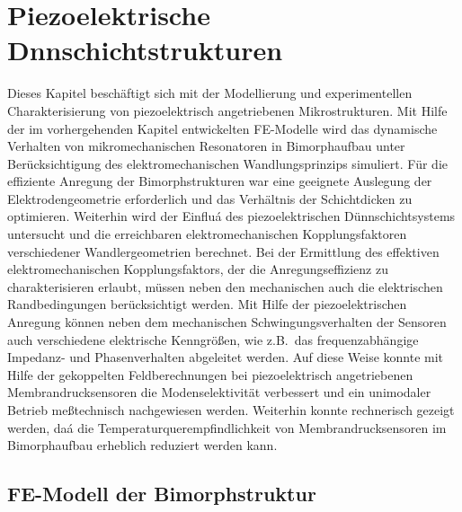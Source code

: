 \chapter{Piezoelektrische Dnnschichtstrukturen}
\label{piezoelektrisch}

Dieses Kapitel beschäftigt sich mit der Modellierung und experimentellen
Charakterisierung von piezoelektrisch angetriebenen Mikrostrukturen.
Mit Hilfe der im vorhergehenden Kapitel entwickelten FE-Modelle wird
das dynamische Verhalten von mikromechanischen Resonatoren in Bimorphaufbau
unter Berücksichtigung des elektromechanischen Wandlungsprinzips simuliert.
Für die effiziente Anregung der Bimorphstrukturen war eine geeignete
Auslegung der Elektrodengeometrie erforderlich und das Verhältnis der
Schichtdicken zu optimieren. Weiterhin wird der Einfluá des piezoelektrischen
Dünnschichtsystems untersucht und die erreichbaren elektromechanischen
Kopplungsfaktoren verschiedener Wand\-lergeometrien berechnet.
Bei der Ermittlung des effektiven elektromechanischen Kopplungsfaktors, der
die Anregungseffizienz zu charakterisieren erlaubt, müssen neben den
mechanischen auch die elektrischen Randbedingungen berücksichtigt werden.
Mit Hilfe der piezoelektrischen Anregung können neben dem mechanischen
Schwingungsverhalten der Sensoren auch verschiedene elektrische
Kenngrößen, wie z.B.\ das frequenzabhängige Impedanz- und Phasenverhalten
abgeleitet werden. Auf diese Weise konnte mit Hilfe der
gekoppelten Feldberechnungen bei piezoelektrisch angetriebenen
Membrandrucksensoren die Modenselektivität verbessert und ein unimodaler
Betrieb meßtechnisch nachgewiesen werden. Weiterhin konnte rechnerisch
gezeigt werden, daá die Temperaturquerempfindlichkeit von
Membrandrucksensoren im Bimorphaufbau erheblich reduziert werden kann.


\section{FE-Modell der Bimorphstruktur}
\label{bimorphstruktur}

